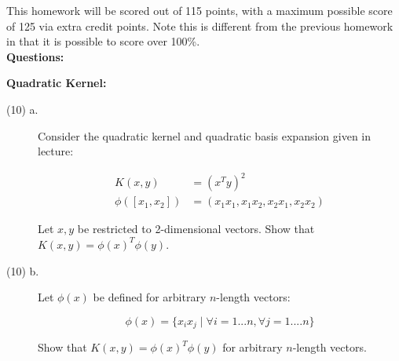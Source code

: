 \documentclass[11pt]{article}
\begin{document}
This homework will be scored out of 115 points, with a maximum possible score of 125 via extra credit points.  Note this is different from the previous homework in that it is possible to score over 100\%.\\

\textbf{Questions:}
\begin{problem}{20} \textbf{Quadratic Kernel:} 
\begin{description}
	\item[(10) a.] Consider the quadratic kernel and quadratic basis expansion given in lecture:
	
	\begin{align*}
	K(x,y) &= (x^Ty)^2\\
	\phi([x_1,x_2]) &= (x_1x_1,x_1x_2,x_2x_1,x_2x_2)
	\end{align*}
	
	 Let $x,y$ be restricted to 2-dimensional vectors.  Show that $K(x,y) = \phi(x)^T \phi(y)$.
	 
	 \item[(10) b.] Let $\phi(x)$ be defined for arbitrary $n$-length vectors:
	 
	 $$\phi(x) = \{x_ix_j \mid \forall i = 1...n, \forall j = 1....n\}$$
	 
	 Show that $K(x,y) = \phi(x)^T \phi(y)$ for arbitrary $n$-length vectors.
\end{description}



\end{problem}
\end{document}
